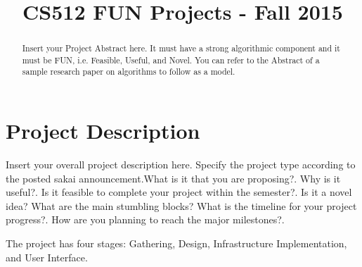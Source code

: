 \documentclass[10pt,conference]{IEEEtran}
\begin{document}
\title{CS512 FUN Projects - Fall 2015}
\author{
}

\maketitle
\begin{abstract}
\textnormal{
Insert your Project Abstract here. It must have a strong algorithmic component and it must be FUN, i.e. Feasible, Useful, and Novel. You can refer to the Abstract of a sample research paper on algorithms to follow as a model.
}
\end{abstract}

\IEEEpeerreviewmaketitle
\section{Project Description}\label{sec:1. Project Description}
\textnormal{
Insert your overall project description here. Specify the project type according to the posted sakai announcement.What is it that you are proposing?. Why is it useful?. Is it feasible to complete your project within the semester?.  Is it a novel idea?  What are the main stumbling blocks? What is the timeline for your project progress?. How are you planning to reach the major milestones?. 
}

The project has four stages: Gathering, Design, Infrastructure Implementation, and User Interface.

%
\end{document}
